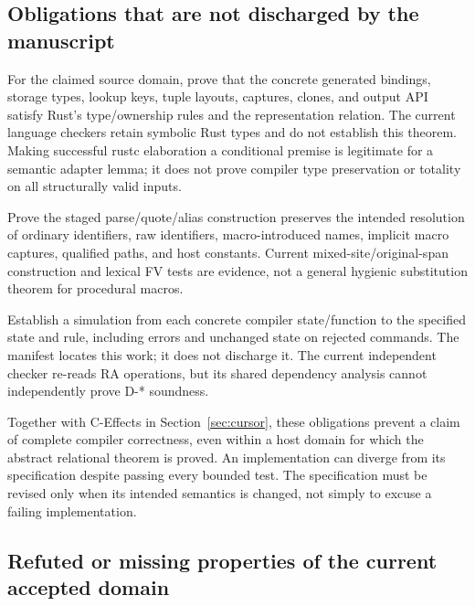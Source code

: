 \subsection{Obligations that are not discharged by the manuscript}
\begin{obligation}
For the claimed source domain, prove that the concrete generated bindings,
storage types, lookup keys, tuple layouts, captures, clones, and output API
satisfy Rust's type/ownership rules and the representation relation.
The current language checkers retain symbolic Rust types and do not establish
this theorem. Making successful rustc elaboration a conditional premise is
legitimate for a semantic adapter lemma; it does not prove compiler type
preservation or totality on all structurally valid inputs.
\end{obligation}
\begin{obligation}
Prove the staged parse/quote/alias construction preserves the intended
resolution of ordinary identifiers, raw identifiers, macro-introduced names,
implicit macro captures, qualified paths, and host constants. Current
mixed-site/original-span construction and lexical FV tests are evidence,
not a general hygienic substitution theorem for procedural macros.
\end{obligation}
\begin{obligation}
Establish a simulation from each concrete compiler state/function to the
specified state and rule, including errors and unchanged state on rejected
commands. The manifest locates this work; it does not discharge it. The
current independent checker re-reads RA operations, but its shared dependency
analysis cannot independently prove D-* soundness.
\end{obligation}
Together with C-Effects in Section~\ref{sec:cursor}, these obligations prevent
a claim of complete compiler correctness, even
within a host domain for which the abstract relational theorem is proved.
An implementation can diverge from its specification despite passing every
bounded test. The specification must be revised only when its intended
semantics is changed, not simply to excuse a failing implementation.

\subsection{Refuted or missing properties of the current accepted domain}
\label{sec:gaps}
